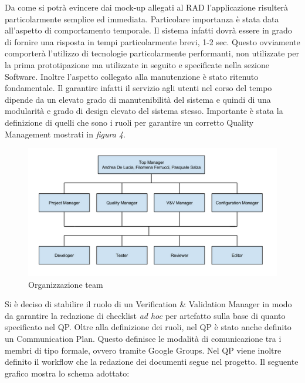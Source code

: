 Da come si potr\`{a} evincere dai mock-up allegati al RAD l\rq applicazione risulter\`{a} particolarmente semplice ed immediata.
Particolare importanza \`{e} stata data all\rq aspetto di comportamento temporale. Il sistema infatti dovr\`{a} essere in grado di fornire una risposta in tempi particolarmente brevi, 1-2 sec.
Questo ovviamente comporter\`{a} l\rq utilizzo di tecnologie particolarmente performanti, non utilizzate per la prima prototipazione ma utilizzate in seguito e specificate nella sezione Software.
Inoltre l\rq aspetto collegato alla manutenzione \`{e} stato ritenuto fondamentale. Il garantire infatti il servizio agli utenti nel corso del tempo dipende da un elevato grado di manutenibilit\`{a} del sistema e quindi di una modularit\`{a} e grado di design elevato del sistema stesso.
Importante \`{e} stata la definizione di quelli che sono i ruoli per garantire un corretto Quality Management mostrati in \emph{figura 4}.
\begin{figure}[tp]
\centering
\includegraphics[scale=.6]{img/10.png}
\caption{Organizzazione team}
\label{fig:cd}
\end{figure}
Si \`{e} deciso di stabilire il ruolo di un Verification \& Validation Manager in modo da garantire la redazione di checklist \emph{ad hoc} per artefatto sulla base di quanto specificato nel QP.
Oltre alla definizione dei ruoli, nel QP \`{e} stato anche definito un Communication Plan. Questo definisce le modalit\`{a} di comunicazione tra i membri di tipo formale, ovvero tramite Google Groups.
Nel QP viene inoltre definito il workflow che la redazione dei documenti segue nel progetto. Il seguente grafico mostra lo schema adottato:
